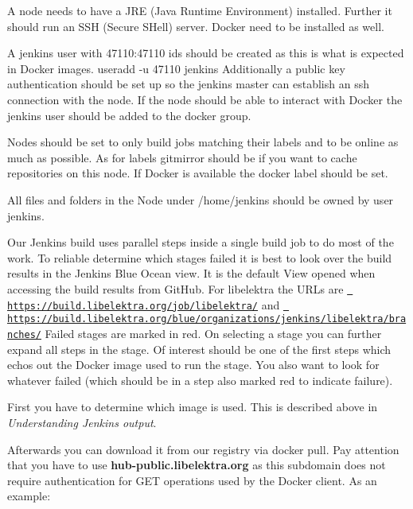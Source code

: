 A node needs to have a J\+RE (Java Runtime Environment) installed. Further it should run an S\+SH (Secure S\+Hell) server. Docker need to be installed as well.

A {\ttfamily jenkins} user with 47110\+:47110 ids should be created as this is what is expected in Docker images. {\ttfamily useradd -\/u 47110 jenkins} Additionally a public key authentication should be set up so the jenkins master can establish an ssh connection with the node. If the node should be able to interact with Docker the jenkins user should be added to the {\ttfamily docker} group.

Nodes should be set to only build jobs matching their labels and to be online as much as possible. As for labels {\ttfamily gitmirror} should be if you want to cache repositories on this node. If Docker is available the {\ttfamily docker} label should be set.

All files and folders in the Node under {\ttfamily /home/jenkins} should be owned by user {\ttfamily jenkins}.

Our Jenkins build uses parallel steps inside a single build job to do most of the work. To reliable determine which stages failed it is best to look over the build results in the Jenkins Blue Ocean view. It is the default View opened when accessing the build results from Git\+Hub. For libelektra the U\+R\+Ls are \href{https://build.libelektra.org/job/libelektra/}{\texttt{ https\+://build.\+libelektra.\+org/job/libelektra/}} and \href{https://build.libelektra.org/blue/organizations/jenkins/libelektra/branches/}{\texttt{ https\+://build.\+libelektra.\+org/blue/organizations/jenkins/libelektra/branches/}} Failed stages are marked in red. On selecting a stage you can further expand all steps in the stage. Of interest should be one of the first steps which echos out the Docker image used to run the stage. You also want to look for whatever failed (which should be in a step also marked red to indicate failure).

First you have to determine which image is used. This is described above in {\itshape Understanding Jenkins output}.

Afterwards you can download it from our registry via {\ttfamily docker pull}. Pay attention that you have to use {\bfseries{hub-\/public.\+libelektra.\+org}} as this subdomain does not require authentication for G\+ET operations used by the Docker client. As an example\+:


\begin{DoxyCode}{0}
\end{DoxyCode}


